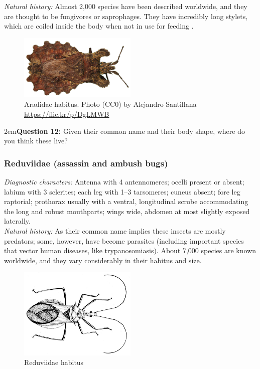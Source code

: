 \documentclass[letterpaper, 11pt]{article}
\begin{document}
\noindent{}\textit{Natural history:} Almost 2,000 species have been described worldwide, and they are thought to be fungivores or saprophages. They have incredibly long stylets, which are coiled inside the body when not in use for feeding \citep{Spooner121}.\\%

\begin{figure}[ht!]
 \centering
 \includegraphics[width=0.5\textwidth]{AradidHabitus}
 \caption{Aradidae habitus. Photo (CC0) by Alejandro Santillana \url{https://flic.kr/p/DgLMWB}}
 \label{fig:aradid1}
\end{figure}

\hangindent2em\textbf{Question 12:} Given their common name and their body shape, where do you think these live?\\

\subsubsection{Reduviidae (assassin and ambush bugs)}
\noindent{}\textit{Diagnostic characters:} Antenna with 4 antennomeres; ocelli present or absent; labium with 3 sclerites; each leg with 1--3 tarsomeres; cuneus absent; fore leg raptorial; prothorax usually with a ventral, longitudinal scrobe accommodating the long and robust mouthparts; wings wide, abdomen at most slightly exposed laterally.\\

\noindent{}\textit{Natural history:} As their common name implies these insects are mostly predators; some, however, have become parasites (including important species that vector human diseases, like trypanosomiasis). About 7,000 species are known worldwide, and they vary considerably in their habitus and size.\\

\begin{figure}[ht!]
 \centering
 \includegraphics[width=0.5\textwidth]{ReduviidHabitus}
 \caption{Reduviidae habitus \citep[][Plate XXXII, Fig. 12]{bhl82061}}
 \label{fig:reduviid1}
\end{figure}
\end{document}
